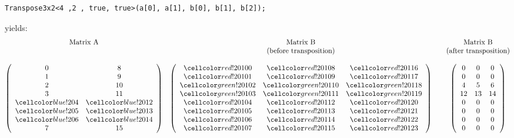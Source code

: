 \vspace{2cm}
\begin{minipage}{\linewidth}
	\begin{verbatim}
Transpose3x2<4 ,2 , true, true>(a[0], a[1], b[0], b[1], b[2]);
	\end{verbatim}
	yields:
	\begin{align*}
	\begin{matrix}
	\textrm{Matrix A} & \textrm{Matrix B}  & & \textrm{Matrix B}\\
	&\textrm{(before transposition)}&&\textrm{(after transposition)}\\
	\\
	\left(\begin{array}{cc}
	0 & 8\\
	1 & 9\\
	2 & 10\\
	3 & 11\\
	\colSrc 4 & \colSrc 12\\
	\colSrc 5 & \colSrc 13\\
	\colSrc 6 & \colSrc 14\\
	7 & 15
	\end{array}\right) 
	&
	\left(\begin{array}{ccc}
	\colOwr 100 & \colOwr 108 & \colOwr 116\\
	\colOwr 101 & \colOwr 109 & \colOwr 117\\
	\colTgt 102 & \colTgt 110 & \colTgt 118\\
	\colTgt 103 & \colTgt 111 & \colTgt 119\\
	\colOwr 104 & \colOwr 112 & \colOwr 120\\
	\colOwr 105 & \colOwr 113 & \colOwr 121\\
	\colOwr 106 & \colOwr 114 & \colOwr 122\\
	\colOwr 107 & \colOwr 115 & \colOwr 123
	\end{array}\right) 
	&&
	\left(\begin{array}{ccc}
	0 & 0 & 0\\
	0 & 0 & 0\\
	4 & 5 & 6\\
	12 & 13 & 14\\
	0 & 0 & 0\\
	0 & 0 & 0\\
	0 & 0 & 0\\
	0 & 0 & 0	
	\end{array}\right) 
	\end{matrix}
	\end{align*}
\end{minipage}


